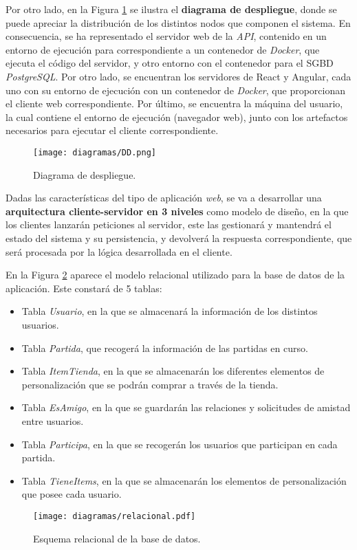 \documentclass[11pt, a4paper, titlepage]{article}
\begin{document}
Por otro lado, en la Figura \ref{ref:despliegue} se ilustra el \textbf{diagrama de despliegue}, donde se puede apreciar la distribución de los distintos nodos que componen el sistema. En consecuencia, se ha representado el servidor web de la \textit{API}, contenido en un entorno de ejecución para correspondiente a un contenedor de \textit{Docker}, que ejecuta el código del servidor, y otro entorno con el contenedor para el SGBD \textit{PostgreSQL}. Por otro lado, se encuentran los servidores de React y Angular, cada uno con su entorno de ejecución con un contenedor de \textit{Docker}, que proporcionan el cliente web correspondiente. Por último, se encuentra la máquina del usuario, la cual contiene el entorno de ejecución (navegador web), junto con los artefactos necesarios para ejecutar el cliente correspondiente. \\

\begin{figure}[!h]
    \centering
    \texttt{[image: diagramas/DD.png]}
    \caption{Diagrama de despliegue.}
    \label{ref:despliegue}
\end{figure}

\FloatBarrier

Dadas las características del tipo de aplicación \textit{web}, se va a desarrollar una \textbf{arquitectura cliente-servidor en 3 niveles} como modelo de diseño, en la que los clientes lanzarán peticiones al servidor, este las gestionará y mantendrá el estado del sistema y su persistencia, y devolverá la respuesta correspondiente, que será procesada por la lógica desarrollada en el cliente. \\

\newpage

En la Figura \ref{ref:relacional} aparece el modelo relacional utilizado para la base de datos de la aplicación. Este constará de 5 tablas:
\begin{itemize}
    \item Tabla \textit{Usuario}, en la que se almacenará la información de los distintos usuarios.
    \item Tabla \textit{Partida}, que recogerá la información de las partidas en curso.
    \item Tabla \textit{ItemTienda}, en la que se almacenarán los diferentes elementos de personalización que se podrán comprar a través de la tienda.
    \item Tabla \textit{EsAmigo}, en la que se guardarán las relaciones y solicitudes de amistad entre usuarios.
    \item Tabla \textit{Participa}, en la que se recogerán los usuarios que participan en cada partida.
    \item Tabla \textit{TieneItems}, en la que se almacenarán los elementos de personalización que posee cada usuario.
\end{itemize}
\begin{figure}[!h]
    \centering
    \texttt{[image: diagramas/relacional.pdf]}
    \caption{Esquema relacional de la base de datos.}
    \label{ref:relacional}
\end{figure}
\end{document}
